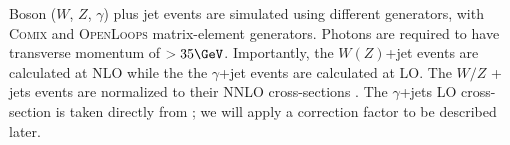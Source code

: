 Boson ($W$, $Z$, $\gamma$) plus jet events are simulated using different \sherpa generators, with \textsc{Comix} and \textsc{OpenLoops} matrix-element generators\cite{ATL-PHYS-PUB-2016-003, comix, openloops}.
Photons are required to have transverse momentum of $> 35 \GeV$.
Importantly, the $W (Z)$+jet events are calculated at NLO while the the $\gamma$+jet events are calculated at LO.
The $W/Z$ + jets events are normalized to their NNLO cross-sections \cite{Catani:2009sm}.
The $\gamma$+jets LO cross-section is taken directly from \sherpa; we will apply a correction factor to be described later.

